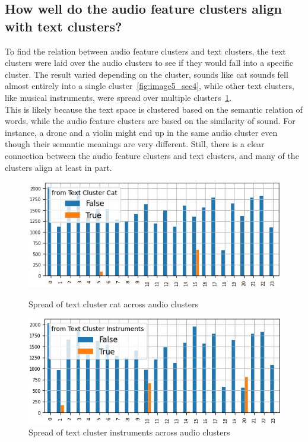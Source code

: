 \subsection{How well do the audio feature clusters align with text clusters?}
\label{sec:Text Features:c}


To find the relation between audio feature clusters and text clusters, the text clusters were laid over the audio clusters to see if they would fall into a specific cluster. The result varied depending on the cluster, sounds like cat sounds fell almost entirely into a single cluster~\ref{fig:image5_sec4}, while other text clusters, like musical instruments, were spread over multiple clusters~\ref{fig:image6_sec4}. \\
This is likely because the text space is clustered based on the semantic relation of words, while the audio feature clusters are based on the similarity of sound. For instance, a drone and a violin might end up in the same audio cluster even though their semantic meanings are very different. 
Still, there is a clear connection between the audio feature clusters and text clusters, and many of the clusters align at least in part.

\begin{figure}[h]
  \centering
  \begin{minipage}[b]{0.49\textwidth}
    \centering
    \includegraphics[width=\textwidth]{figs/cat_test_cluster_over_audio_cluster.jpg}
    \caption{Spread of text cluster cat across audio clusters}
    \label{fig:image5_sec4}
  \end{minipage}
  \hfill
  \begin{minipage}[b]{0.49\textwidth}
    \centering
    \includegraphics[width=\textwidth]{figs/instruments_test_cluster_over_audio_cluster.jpg}
    \caption{Spread of text cluster instruments across audio clusters}
    \label{fig:image6_sec4}
  \end{minipage}
\end{figure}



